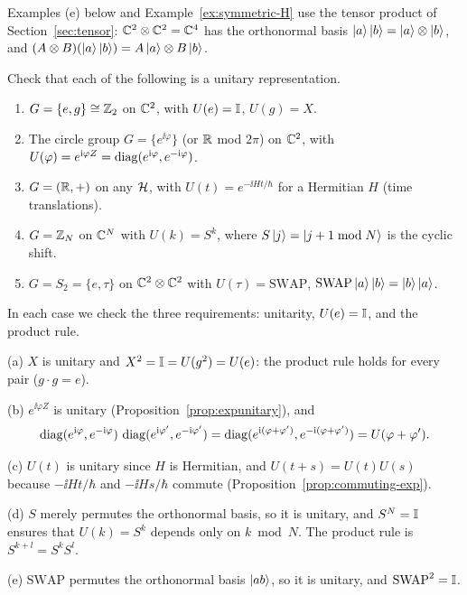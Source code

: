\begin{recall}
  Examples (e) below and Example~\ref{ex:symmetric-H} use the tensor product of Section~\ref{sec:tensor}: $\mathbb{C}^2\otimes\mathbb{C}^2=\mathbb{C}^4$ has the orthonormal basis $\left|a\right\rangle\left|b\right\rangle=\left|a\right\rangle\otimes\left|b\right\rangle$, and $(A\otimes B)(\left|a\right\rangle\left|b\right\rangle)=A\left|a\right\rangle\otimes B\left|b\right\rangle$.
\end{recall}

\begin{example}\label{ex:reps}
  Check that each of the following is a unitary representation.
  \begin{enumerate}
    \item[(a)] $G=\{e,g\}\cong\mathbb{Z}_2$ on $\mathbb{C}^2$, with $U(e)=\mathbb{I}$, $U(g)=X$.
    \item[(b)] The circle group $G=\{e^{\ii\varphi}\}$ (or $\mathbb{R}$ mod $2\pi$) on $\mathbb{C}^2$, with $U(\varphi)=e^{\mathrm{i}\varphi Z}=\operatorname{diag}(e^{\mathrm{i}\varphi},e^{-\mathrm{i}\varphi})$.
    \item[(c)] $G=(\mathbb{R},+)$ on any $\mathcal{H}$, with $U(t)=e^{-\ii Ht/\hbar}$ for a Hermitian $H$ (time translations).
    \item[(d)] $G=\mathbb{Z}_N$ on $\mathbb{C}^N$ with $U(k)=S^k$, where $S\left|j\right\rangle=\left|j+1\bmod N\right\rangle$ is the cyclic shift.
    \item[(e)] $G=S_2=\{e,\tau\}$ on $\mathbb{C}^2\otimes\mathbb{C}^2$ with $U(\tau)=\mathrm{SWAP}$, $\mathrm{SWAP}\left|a\right\rangle\left|b\right\rangle=\left|b\right\rangle\left|a\right\rangle$.
  \end{enumerate}
\end{example}
\begin{solution}
  In each case we check the three requirements: unitarity, $U(e)=\mathbb{I}$, and the product rule.
  \begin{steps}
    \item (a) $X$ is unitary and $X^2=\mathbb{I}=U(g^2)=U(e)$: the product rule holds for every pair ($g\cdot g=e$).
    \item (b) $e^{\ii\varphi Z}$ is unitary (Proposition~\ref{prop:expunitary}), and
      \[
        \operatorname{diag}(e^{\mathrm{i}\varphi},e^{-\mathrm{i}\varphi})\,\operatorname{diag}(e^{\mathrm{i}\varphi'},e^{-\mathrm{i}\varphi'})=\operatorname{diag}(e^{\mathrm{i}(\varphi+\varphi')},e^{-\mathrm{i}(\varphi+\varphi')})=U(\varphi+\varphi').
      \]
    \item (c) $U(t)$ is unitary since $H$ is Hermitian, and $U(t+s)=U(t)U(s)$ because $-\ii Ht/\hbar$ and $-\ii Hs/\hbar$ commute (Proposition~\ref{prop:commuting-exp}).
    \item (d) $S$ merely permutes the orthonormal basis, so it is unitary, and $S^N=\mathbb{I}$ ensures that $U(k)=S^k$ depends only on $k\bmod N$. The product rule is $S^{k+l}=S^kS^l$.
    \item (e) $\mathrm{SWAP}$ permutes the orthonormal basis $\left|ab\right\rangle$, so it is unitary, and $\mathrm{SWAP}^2=\mathbb{I}$.
  \end{steps}
\end{solution}

